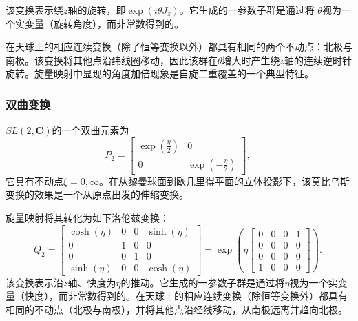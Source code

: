 该变换表示绕$z$轴的旋转，即$\exp(i\theta J_{z})$。它生成的一参数子群是通过将 $\theta$视为一个实变量（旋转角度），而非常数得到的。

在天球上的相应连续变换（除了恒等变换以外）都具有相同的两个不动点：北极与南极。该变换将其他点沿纬线圈移动，因此该群在$\theta$增大时产生绕$z$轴的连续逆时针旋转。旋量映射中显现的角度加倍现象是自旋二重覆盖的一个典型特征。
\subsubsection{双曲变换}
$SL(2,\mathbf{C})$的一个双曲元素为
\[
P_{2} =
\begin{bmatrix}
\exp\!\left(\tfrac{\eta}{2}\right) & 0 \\
0 & \exp\!\left(-\tfrac{\eta}{2}\right)
\end{bmatrix},~
\]
它具有不动点$\xi = 0, \infty$。在从黎曼球面到欧几里得平面的立体投影下，该莫比乌斯变换的效果是一个从原点出发的伸缩变换。

旋量映射将其转化为如下洛伦兹变换：
\[
Q_{2} =
\begin{bmatrix}
\cosh(\eta) & 0 & 0 & \sinh(\eta) \\
0 & 1 & 0 & 0 \\
0 & 0 & 1 & 0 \\
\sinh(\eta) & 0 & 0 & \cosh(\eta)
\end{bmatrix}
=
\exp\!\left(
\eta
\begin{bmatrix}
0 & 0 & 0 & 1 \\
0 & 0 & 0 & 0 \\
0 & 0 & 0 & 0 \\
1 & 0 & 0 & 0
\end{bmatrix}
\right).~
\]
该变换表示沿$z$轴、快度为$\eta$的推动。它生成的一参数子群是通过将$\eta$视为一个实变量（快度），而非常数得到的。在天球上的相应连续变换（除恒等变换外）都具有相同的不动点（北极与南极），并将其他点沿经线移动，从南极远离并趋向北极。
